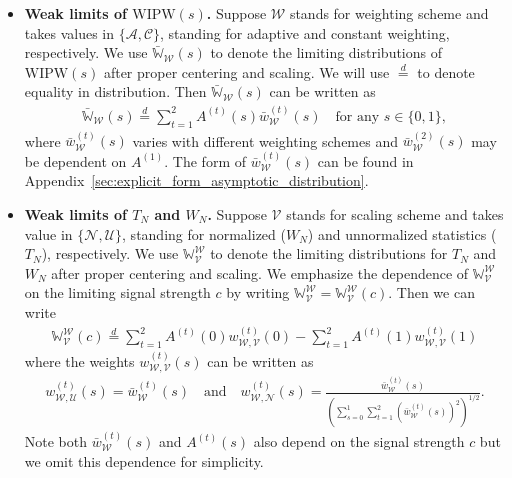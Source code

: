 \documentclass[12pt]{article}
\newcommand{\WIPW}{\mathrm{WIPW}}
\begin{document}
\begin{itemize}
	\item \textbf{Weak limits of $\WIPW(s)$.} Suppose $\mathcal{W}$ stands for weighting scheme and takes values in $\{\mathcal{A},\mathcal{C}\}$, standing for adaptive and constant weighting, respectively. We use $\bar{\mathbb{W}}_{\mathcal{W}}(s)$ to denote the limiting distributions of $\WIPW(s)$ after proper centering and scaling. We will use $\overset{d}{=}$ to denote equality in distribution. Then $\bar{\mathbb{W}}_{\mathcal{W}}(s)$ can be written as
	\begin{align}\label{eq:limiting_representation_single_outcome}
		\bar{\mathbb{W}}_{\mathcal{W}}(s)\overset{d}{=}\sum_{t=1}^2 A^{(t)}(s) \bar w_{\mathcal{W}}^{(t)}(s)\quad\text{for any }s\in\{0,1\},
	\end{align} 
	where $\bar w_{\mathcal{W}}^{(t)}(s)$ varies with different weighting schemes and $\bar w_{\mathcal{W}}^{(2)}(s)$ may be dependent on $A^{(1)}$. The form of $\bar w_{\mathcal{W}}^{(t)}(s)$ can be found in Appendix~\ref{sec:explicit_form_asymptotic_distribution}.
	
	\item \textbf{Weak limits of $T_N$ and $W_N$.} Suppose $\mathcal{V}$ stands for scaling scheme and takes value in $\{\mathcal{N},\mathcal{U}\}$, standing for normalized ($W_N$) and unnormalized statistics ($T_N$), respectively. We use $\mathbb{W}_{\mathcal{V}}^{\mathcal{W}}$ to denote the limiting distributions for $T_N$ and $W_N$ after proper centering and scaling. We emphasize the dependence of $\mathbb{W}_{\mathcal{V}}^{\mathcal{W}}$ on the limiting signal strength $c$ by writing $\mathbb{W}_{\mathcal{V}}^{\mathcal{W}}=\mathbb{W}_{\mathcal{V}}^{\mathcal{W}}(c)$. Then we can write
	\begin{align}\label{eq:limiting_representation}
		\mathbb{W}_{\mathcal{V}}^{\mathcal{W}}(c)\overset{d}{=}\sum_{t=1}^2 A^{(t)}(0) w_{\mathcal{W},\mathcal{V}}^{(t)}(0) -\sum_{t=1}^2 A^{(t)}(1) w_{\mathcal{W},\mathcal{V}}^{(t)}(1)
	\end{align}
	where the weights $w_{\mathcal{W},\mathcal{V}}^{(t)}(s)$ can be written as 
	\begin{align*}
		w_{\mathcal{W},\mathcal{U}}^{(t)}(s)=\bar w_{\mathcal{W}}^{(t)}(s)\quad\text{and}\quad w_{\mathcal{W},\mathcal{N}}^{(t)}(s)=\frac{\bar w_{\mathcal{W}}^{(t)}(s) }{(\sum_{s=0}^1\sum_{t=1}^2 (\bar w_{\mathcal{W}}^{(t)}(s))^2)^{1/2}}.
	\end{align*}
	Note both $\bar w_{\mathcal{W}}^{(t)}(s)$ and $A^{(t)}(s)$ also depend on the signal strength $c$ but we omit this dependence for simplicity. 
\end{itemize} 
\end{document}
